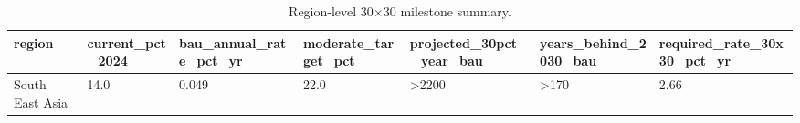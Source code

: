 \begin{table}[htbp]
\centering
\small
\begin{tabular}{lllllll}
\hline
region & current\_pct\_2024 & bau\_annual\_rate\_pct\_yr & moderate\_target\_pct & projected\_30pct\_year\_bau & years\_behind\_2030\_bau & required\_rate\_30x30\_pct\_yr \\
\hline
South East Asia & 14.0 & 0.049 & 22.0 & >2200 & >170 & 2.66 \\
\hline
\end{tabular}
\caption{Region-level 30×30 milestone summary.}
\label{tab:pathway_milestone}
\end{table}